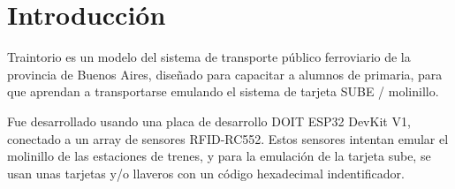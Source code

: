 \documentclass[../informe_krapp.tex]{subfiles}
\begin{document}
\graphicspath{{../images/}}
\section{Introducción}
Traintorio es un modelo
del sistema de transporte público ferroviario de la provincia de Buenos Aires,
diseñado para capacitar a alumnos de primaria, para que aprendan a transportarse
emulando el sistema de tarjeta SUBE / molinillo.

Fue desarrollado usando una placa de desarrollo DOIT ESP32 DevKit V1, conectado
a un array de sensores RFID-RC552. Estos sensores intentan emular el molinillo de
las estaciones de trenes, y para la emulación de la tarjeta sube, se usan unas
tarjetas y/o llaveros con un código hexadecimal indentificador.
\end{document}
